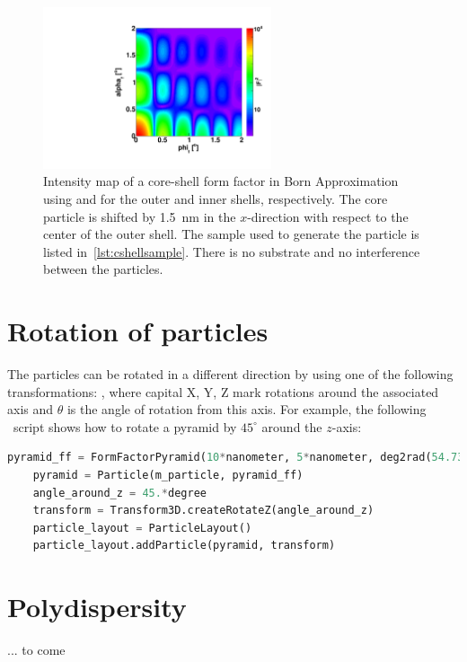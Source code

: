 \begin{figure}[ht]
\begin{center}
\includegraphics[angle=-90,width=0.6\textwidth]{fig/gisasmap/CoreShellParallPyr.pdf}
\end{center}
\caption{Intensity map of a core-shell form factor in Born Approximation using   and  for the outer and inner shells, respectively. The core particle is shifted by 1.5~nm in the $x$-direction with respect to the center of the outer shell. The sample used to generate the particle is listed in~\ref{lst:cshellsample}.  There is no substrate and no interference between the particles.}
\label{fig:FFCoreShellBA}
\end{figure}

\section{Rotation of particles}

The particles can be rotated in a different direction by using one of
the following transformations: , where capital X, Y, Z mark rotations
around the associated axis and $\theta$ is the
angle of rotation from this axis. For example, the following \ script shows how to rotate a pyramid by $45^{\circ}$ around
the $z$-axis:\\

\begin{lstlisting}[language=python, style=eclipseboxed,numbers=none,nolol]
    pyramid_ff = FormFactorPyramid(10*nanometer, 5*nanometer, deg2rad(54.73 ) )
    pyramid = Particle(m_particle, pyramid_ff)
    angle_around_z = 45.*degree
    transform = Transform3D.createRotateZ(angle_around_z)
    particle_layout = ParticleLayout()
    particle_layout.addParticle(pyramid, transform) 
\end{lstlisting}

\section{Polydispersity}

... to come
